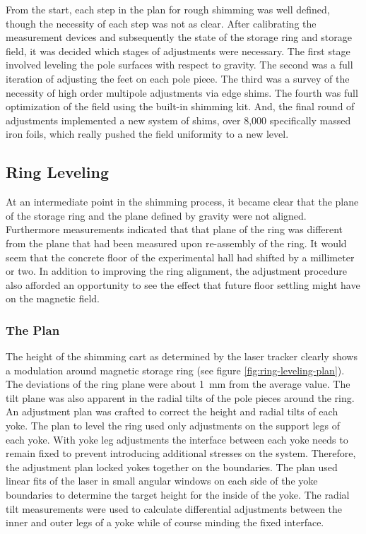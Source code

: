 From the start, each step in the plan for rough shimming was well defined, though the necessity of each step was not as clear.  After calibrating the measurement devices and subsequently the state of the storage ring and storage field, it was decided which stages of adjustments were necessary.  The first stage involved leveling the pole surfaces with respect to gravity.  The second was a full iteration of adjusting the feet on each pole piece.  The third was a survey of the necessity of high order multipole adjustments via edge shims.  The fourth was full optimization of the field using the built-in shimming kit.  And, the final round of adjustments implemented a new system of shims, over 8,000 specifically massed iron foils, which really pushed the field uniformity to a new level.

\subsection{Ring Leveling}
At an intermediate point in the shimming process, it became clear that the plane of the storage ring and the plane defined by gravity were not aligned.  Furthermore measurements indicated that that plane of the ring was different from the plane that had been measured upon re-assembly of the ring.  It would seem that the concrete floor of the experimental hall had shifted by a millimeter or two.  In addition to improving the ring alignment, the adjustment procedure also afforded an opportunity to see the effect that future floor settling might have on the magnetic field.

\subsubsection{The Plan}
The height of the shimming cart as determined by the laser tracker clearly shows a modulation around magnetic storage ring (see figure \ref{fig:ring-leveling-plan}).  The deviations of the ring plane were about \SI{1}{\milli\meter} from the average value.  The tilt plane was also apparent in the radial tilts of the pole pieces around the ring.  An adjustment plan was crafted to correct the height and radial tilts of each yoke.  The plan to level the ring used only adjustments on the support legs of each yoke. With yoke leg adjustments the interface between each yoke needs to remain fixed to prevent introducing additional stresses on the system.  Therefore, the adjustment plan locked yokes together on the boundaries.  The plan used linear fits of the laser in small angular windows on each side of the yoke boundaries to determine the target height for the inside of the yoke.  The radial tilt measurements were used to calculate differential adjustments between the inner and outer legs of a yoke while of course minding the fixed interface. 

